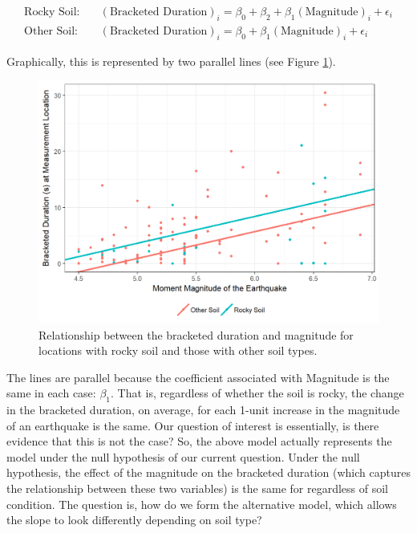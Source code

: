 \documentclass[]{book}
\theoremstyle{plain}
\theoremstyle{mydefn}
\theoremstyle{myexmpl}
\theoremstyle{remark}
\begin{document}
\[
\begin{aligned}
  \text{Rocky Soil:} &\quad (\text{Bracketed Duration})_i = \beta_0 + \beta_2 + \beta_1(\text{Magnitude})_i + \epsilon_i\\
  \text{Other Soil:} &\quad (\text{Bracketed Duration})_i = \beta_0 + \beta_1(\text{Magnitude})_i + \epsilon_i
\end{aligned}
\]

Graphically, this is represented by two parallel lines (see Figure
\ref{fig:regextensions-ind-plot}).

\begin{figure}

{\centering \includegraphics[width=0.8\linewidth]{./Images/regextensions-ind-plot-1} 

}

\caption{Relationship between the bracketed duration and magnitude for locations with rocky soil and those with other soil types.}\label{fig:regextensions-ind-plot}
\end{figure}

The lines are parallel because the coefficient associated with Magnitude
is the same in each case: \(\beta_1\). That is, regardless of whether
the soil is rocky, the change in the bracketed duration, on average, for
each 1-unit increase in the magnitude of an earthquake is the same. Our
question of interest is essentially, is there evidence that this is not
the case? So, the above model actually represents the model under the
null hypothesis of our current question. Under the null hypothesis, the
effect of the magnitude on the bracketed duration (which captures the
relationship between these two variables) is the same for regardless of
soil condition. The question is, how do we form the alternative model,
which allows the slope to look differently depending on soil type?
\end{document}
